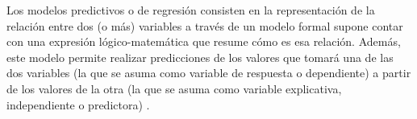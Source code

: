\documentclass[11pt]{diazessay} %
\begin{document}
Los modelos predictivos o de regresión consisten en la representación de la relación entre dos (o más) variables a través de un modelo formal supone contar con una expresión lógico-matemática que resume cómo es esa relación. Además, este modelo permite realizar predicciones de los valores que tomará una de las dos variables (la que se asuma como variable de respuesta o dependiente) a partir de los valores de la otra (la que se asuma como variable explicativa, independiente o predictora) \cite{modelo_regresion}.






%
%
%
\end{document}
